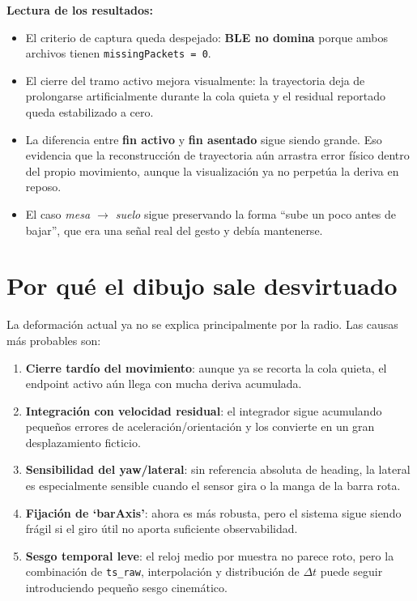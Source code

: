 \documentclass[11pt,a4paper]{article}
\begin{document}
\textbf{Lectura de los resultados:}
\begin{itemize}[leftmargin=14pt]
  \item El criterio de captura queda despejado: \textbf{BLE no domina} porque ambos archivos tienen \texttt{missingPackets = 0}.
  \item El cierre del tramo activo mejora visualmente: la trayectoria deja de prolongarse artificialmente durante la cola quieta y el residual reportado queda estabilizado a cero.
  \item La diferencia entre \textbf{fin activo} y \textbf{fin asentado} sigue siendo grande. Eso evidencia que la reconstrucci\'on de trayectoria a\'un arrastra error f\'isico dentro del propio movimiento, aunque la visualizaci\'on ya no perpet\'ua la deriva en reposo.
  \item El caso \emph{mesa $\rightarrow$ suelo} sigue preservando la forma ``sube un poco antes de bajar'', que era una se\~nal real del gesto y deb\'ia mantenerse.
\end{itemize}

\section{Por qu\'e el dibujo sale desvirtuado}
La deformaci\'on actual ya no se explica principalmente por la radio. Las causas m\'as probables son:
\begin{enumerate}[leftmargin=16pt]
  \item \textbf{Cierre tard\'io del movimiento}: aunque ya se recorta la cola quieta, el endpoint activo a\'un llega con mucha deriva acumulada.
  \item \textbf{Integraci\'on con velocidad residual}: el integrador sigue acumulando peque\~nos errores de aceleraci\'on/orientaci\'on y los convierte en un gran desplazamiento ficticio.
  \item \textbf{Sensibilidad del yaw/lateral}: sin referencia absoluta de heading, la lateral es especialmente sensible cuando el sensor gira o la manga de la barra rota.
  \item \textbf{Fijaci\'on de `barAxis'}: ahora es m\'as robusta, pero el sistema sigue siendo fr\'agil si el giro \'util no aporta suficiente observabilidad.
  \item \textbf{Sesgo temporal leve}: el reloj medio por muestra no parece roto, pero la combinaci\'on de \texttt{ts\_raw}, interpolaci\'on y distribuci\'on de \(\Delta t\) puede seguir introduciendo peque\~no sesgo cinem\'atico.
\end{enumerate}
\end{document}

